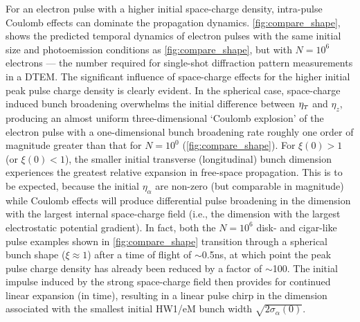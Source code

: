 For an electron pulse with a higher initial space-charge density, intra-pulse Coulomb effects can dominate the propagation dynamics.
\ref{fig:compare_shape}, shows the predicted temporal dynamics of electron pulses with the same initial size and photoemission conditions as \ref{fig:compare_shape}, but with $ N = 10^{6} $ electrons --- the number required for single-shot diffraction pattern measurements in a DTEM.\cite{berger_dc_2009,armstrong_practical_2007}
The significant influence of space-charge effects for the higher initial peak pulse charge density is clearly evident.
In the spherical case, space-charge induced bunch broadening overwhelms the initial difference between $\eta_{{\scriptscriptstyle T}}$ and $\eta_{z}$, producing an almost uniform three-dimensional `Coulomb explosion' of the electron pulse with a one-dimensional bunch broadening rate roughly one order of magnitude greater than that for $ N = 10^{0} $ (\ref{fig:compare_shape}).
For $ \xi (0) > 1 $ (or $ \xi (0) < 1 $), the smaller initial transverse (longitudinal) bunch dimension experiences the greatest relative expansion in free-space propagation. This is to be expected, because the initial $\eta_{\alpha}$ are non-zero (but comparable in magnitude) while Coulomb effects will produce differential pulse broadening in the dimension with the largest internal space-charge field (i.e., the dimension with the largest electrostatic potential gradient).
In fact, both the $ N = 10^{6} $ disk- and cigar-like pulse examples shown in \ref{fig:compare_shape} transition through a spherical bunch shape ($ \xi \approx 1 $) after a time of flight of $\sim$0.5ns, at which point the peak pulse charge density has already been reduced by a factor of $\sim$100.
The initial impulse induced by the strong space-charge field then provides for continued linear expansion (in time), resulting in a linear pulse chirp in the dimension associated with the smallest initial HW1/eM bunch width\cite{michalik_analytic_2006,berger_dc_2009} $ \sqrt{ 2 \sigma_{\alpha} (0) } $.

